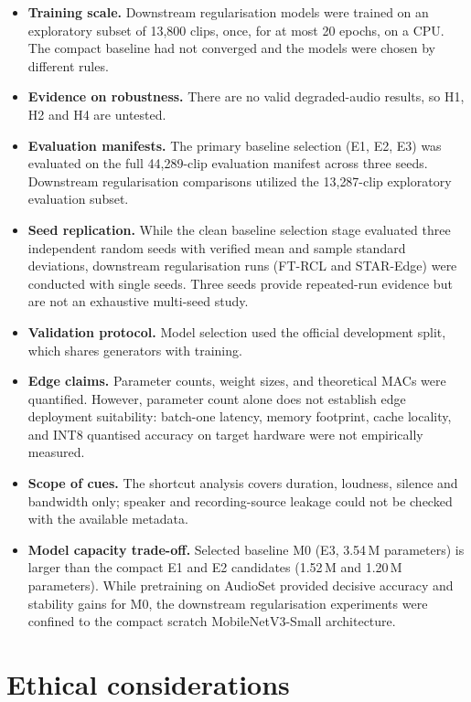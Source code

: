 \begin{itemize}
  \item \textbf{Training scale.} Downstream regularisation models were trained on an exploratory subset of 13{,}800 clips, once, for at most 20 epochs, on a CPU. The compact baseline had not converged and the models were chosen by different rules.
  \item \textbf{Evidence on robustness.} There are no valid degraded-audio results, so H1, H2 and H4 are untested.
  \item \textbf{Evaluation manifests.} The primary baseline selection (E1, E2, E3) was evaluated on the full 44{,}289-clip evaluation manifest across three seeds. Downstream regularisation comparisons utilized the 13{,}287-clip exploratory evaluation subset.
  \item \textbf{Seed replication.} While the clean baseline selection stage evaluated three independent random seeds with verified mean and sample standard deviations, downstream regularisation runs (FT-RCL and STAR-Edge) were conducted with single seeds. Three seeds provide repeated-run evidence but are not an exhaustive multi-seed study.
  \item \textbf{Validation protocol.} Model selection used the official development split, which shares generators with training.
  \item \textbf{Edge claims.} Parameter counts, weight sizes, and theoretical MACs were quantified. However, parameter count alone does not establish edge deployment suitability: batch-one latency, memory footprint, cache locality, and INT8 quantised accuracy on target hardware were not empirically measured.
  \item \textbf{Scope of cues.} The shortcut analysis covers duration, loudness, silence and bandwidth only; speaker and recording-source leakage could not be checked with the available metadata.
  \item \textbf{Model capacity trade-off.} Selected baseline M0 (E3, 3.54\,M parameters) is larger than the compact E1 and E2 candidates (1.52\,M and 1.20\,M parameters). While pretraining on AudioSet provided decisive accuracy and stability gains for M0, the downstream regularisation experiments were confined to the compact scratch MobileNetV3-Small architecture.
\end{itemize}

\section{Ethical considerations}

